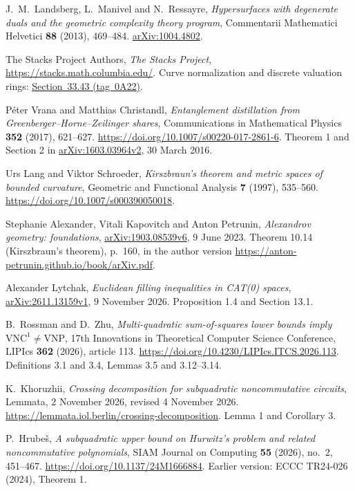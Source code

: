 J.~M.~Landsberg, L.~Manivel and N.~Ressayre,
\emph{Hypersurfaces with degenerate duals and the geometric complexity
theory program},
Commentarii Mathematici Helvetici \textbf{88} (2013), 469--484.
\href{https://arxiv.org/abs/1004.4802}{arXiv:1004.4802}.

The Stacks Project Authors,
\emph{The Stacks Project},
\url{https://stacks.math.columbia.edu/}.
Curve normalization and discrete valuation rings:
\href{https://stacks.math.columbia.edu/tag/0A22}{Section~33.43 (tag~0A22)}.

P\'eter Vrana and Matthias Christandl,
\emph{Entanglement distillation from Greenberger--Horne--Zeilinger shares},
Communications in Mathematical Physics \textbf{352} (2017), 621--627.
\url{https://doi.org/10.1007/s00220-017-2861-6}.
Theorem 1 and Section 2 in \href{https://arxiv.org/abs/1603.03964v2}{arXiv:1603.03964v2}, 30 March 2016.

 Urs Lang and Viktor Schroeder, \emph{Kirszbraun's theorem and metric spaces of bounded curvature}, Geometric and Functional Analysis \textbf{7} (1997), 535--560. \url{https://doi.org/10.1007/s000390050018}.


 Stephanie Alexander, Vitali Kapovitch and Anton Petrunin, \emph{Alexandrov geometry: foundations}, \href{https://arxiv.org/abs/1903.08539v6}{arXiv:1903.08539v6}, 9 June 2023. Theorem 10.14 (Kirszbraun's theorem), p.~160, in the author version \url{https://anton-petrunin.github.io/book/arXiv.pdf}.


 Alexander Lytchak, \emph{Euclidean filling inequalities in CAT(0) spaces}, \href{https://arxiv.org/abs/2611.13159v1}{arXiv:2611.13159v1}, 9 November 2026. Proposition 1.4 and Section 13.1.

B.~Rossman and D.~Zhu,
\emph{Multi-quadratic sum-of-squares lower bounds imply
$\mathrm{VNC}^{1}\ne\mathrm{VNP}$},
17th Innovations in Theoretical Computer Science Conference,
LIPIcs \textbf{362} (2026), article 113.
\url{https://doi.org/10.4230/LIPIcs.ITCS.2026.113}.
Definitions 3.1 and 3.4, Lemmas 3.5 and 3.12--3.14.

K.~Khoruzhii, \emph{Crossing decomposition for subquadratic
noncommutative circuits}, Lemmata, 2 November 2026,
revised 4 November 2026.
\url{https://lemmata.iol.berlin/crossing-decomposition}.
Lemma 1 and Corollary 3.

P.~Hrube\v{s}, \emph{A subquadratic upper bound on Hurwitz's
problem and related noncommutative polynomials},
SIAM Journal on Computing \textbf{55} (2026), no.~2, 451--467.
\url{https://doi.org/10.1137/24M1666884}.
Earlier version: ECCC TR24-026 (2024), Theorem 1.

